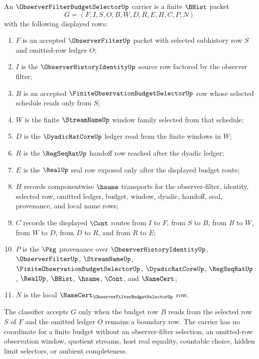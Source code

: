\begin{definition}
\label{def:observer-filter-budget-selector-carrier}
An $\ObserverFilterBudgetSelectorUp$ carrier is a finite $\BHist$ packet
$$
G=(F,I,S,O,B,W,D,R,E,H,C,P,N)
$$
with the following displayed rows:
\begin{enumerate}
\item $F$ is an accepted $\ObserverFilterUp$ packet with selected subhistory row $S$ and omitted-row ledger $O$;
\item $I$ is the $\ObserverHistoryIdentityUp$ source row factored by the observer filter;
\item $B$ is an accepted $\FiniteObservationBudgetSelectorUp$ row whose selected schedule reads only from $S$;
\item $W$ is the finite $\StreamNameUp$ window family selected from that schedule;
\item $D$ is the $\DyadicRatCoreUp$ ledger read from the finite windows in $W$;
\item $R$ is the $\RegSeqRatUp$ handoff row reached after the dyadic ledger;
\item $E$ is the $\RealUp$ seal row exposed only after the displayed budget route;
\item $H$ records componentwise $\hsame$ transports for the observer-filter, identity, selected row, omitted ledger, budget, window, dyadic, handoff, seal, provenance, and local name rows;
\item $C$ records the displayed $\Cont$ routes from $I$ to $F$, from $S$ to $B$, from $B$ to $W$, from $W$ to $D$, from $D$ to $R$, and from $R$ to $E$;
\item $P$ is the $\Pkg$ provenance over $\ObserverHistoryIdentityUp$, $\ObserverFilterUp$, $\StreamNameUp$, $\FiniteObservationBudgetSelectorUp$, $\DyadicRatCoreUp$, $\RegSeqRatUp$, $\RealUp$, $\BHist$, $\hsame$, $\Cont$, and $\NameCert$;
\item $N$ is the local $\NameCert_{\ObserverFilterBudgetSelectorUp}$ row.
\end{enumerate}
The classifier accepts $G$ only when the budget row $B$ reads from the selected row $S$ of $F$ and the omitted ledger $O$ remains a boundary row. The carrier has no coordinate for a finite budget without an observer-filter selection, an omitted-row observation window, quotient streams, host real equality, countable choice, hidden limit selectors, or ambient completeness.
\end{definition}


